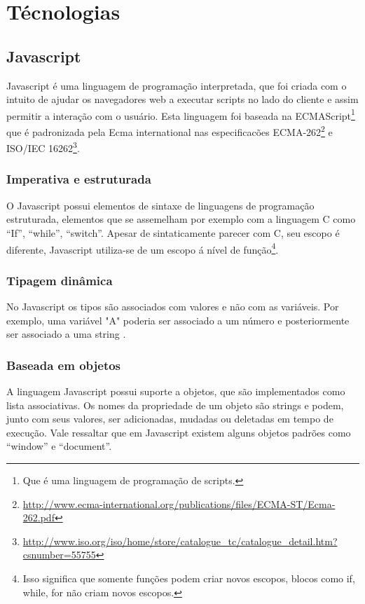 \chapter{Técnologias}
\label{tecnologias}

\section{Javascript}
Javascript  é uma linguagem de programação interpretada, que foi criada com o intuito de ajudar os navegadores web a executar scripts no lado do cliente e assim permitir a interação com o usuário\cite{jsRight}. Esta linguagem foi baseada na ECMAScript\footnote{Que  é uma linguagem de programação de scripts.} que é padronizada pela Ecma international nas especificacões ECMA-262\footnote{\url{http://www.ecma-international.org/publications/files/ECMA-ST/Ecma-262.pdf}} e ISO/IEC 16262\footnote{\url{http://www.iso.org/iso/home/store/catalogue_tc/catalogue_detail.htm?csnumber=55755}}.
 \subsection{Imperativa e estruturada}
	
O Javascript possui elementos de sintaxe de linguagens de programação estruturada, elementos que se assemelham por exemplo com a linguagem C como “If”, “while”, “switch”.
Apesar de sintaticamente parecer com C, seu escopo é diferente, Javascript utiliza-se de um escopo á nível de função\footnote{Isso significa que somente funções podem criar novos escopos, blocos como if, while, for não criam novos escopos.}.


 \subsection{Tipagem dinâmica}
 
No Javascript os tipos são associados com valores e não com as variáveis. Por exemplo, uma variável "A" poderia ser associado a um número e posteriormente ser associado a uma string .

 

 \subsection{Baseada em objetos}

A linguagem Javascript possui suporte a  objetos, que são implementados como lista associativas. Os nomes da propriedade de um objeto  são strings e podem, junto com seus valores, ser adicionadas, mudadas ou deletadas em tempo de execução. Vale ressaltar que em Javascript existem alguns objetos padrões como “window” e “document”.


